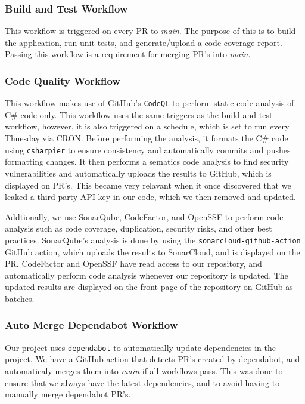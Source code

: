 \subsubsection{Build and Test Workflow}
This workflow is triggered on every PR to \textit{main}.
The purpose of this is to build the application, run unit tests, and generate/upload a code coverage report.
Passing this workflow is a requirement for merging PR's into \textit{main}.

\subsubsection{Code Quality Workflow}
This workflow makes use of GitHub's \texttt{CodeQL} to perform static code analysis of C\# code only.
This workflow uses the same triggers as the build and test workflow, however, it is also triggered on a schedule, 
which is set to run every Thuesday via CRON.
Before performing the analysis, it formats the C\# code using \texttt{csharpier} to 
ensure consistency and automatically commits and pushes formatting changes.
It then performs a sematics code analysis to find security vulnerabilities and automatically uploads the results to GitHub, 
which is displayed on PR's.
This became very relavant when it once discovered that we leaked a third party API key in our code, which we then removed and updated.

Addtionally, we use SonarQube, CodeFactor, and OpenSSF to perform code analysis 
such as code coverage, duplication, security risks, and other best practices.
SonarQube's analysis is done by using the \texttt{sonarcloud-github-action} 
GitHub action, which uploads the results to SonarCloud, and is displayed on the PR.
CodeFactor and OpenSSF have read access to our repository, and automatically 
perform code analysis whenever our repository is updated.
The updated results are displayed on the front page of the repository on GitHub as batches.

\subsubsection{Auto Merge Dependabot Workflow}
Our project uses \texttt{dependabot} to automatically update dependencies in the project.
We have a GitHub action that detects PR's created by dependabot, and automaticaly merges 
them into \textit{main} if all workflows pass.
This was done to ensure that we always have the latest dependencies,
and to avoid having to manually merge dependabot PR's.

